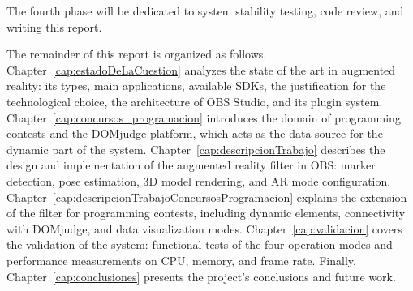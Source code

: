 The fourth phase will be dedicated to system stability testing, code review, and writing this report.

The remainder of this report is organized as follows. Chapter~\ref{cap:estadoDeLaCuestion} analyzes the state of the art in augmented reality: its types, main applications, available SDKs, the justification for the technological choice, the architecture of OBS Studio, and its plugin system. Chapter~\ref{cap:concursos_programacion} introduces the domain of programming contests and the DOMjudge platform, which acts as the data source for the dynamic part of the system. Chapter~\ref{cap:descripcionTrabajo} describes the design and implementation of the augmented reality filter in OBS: marker detection, pose estimation, 3D model rendering, and AR mode configuration. Chapter~\ref{cap:descripcionTrabajoConcursosProgramacion} explains the extension of the filter for programming contests, including dynamic elements, connectivity with DOMjudge, and data visualization modes. Chapter~\ref{cap:validacion} covers the validation of the system: functional tests of the four operation modes and performance measurements on CPU, memory, and frame rate. Finally, Chapter~\ref{cap:conclusiones} presents the project's conclusions and future work.
